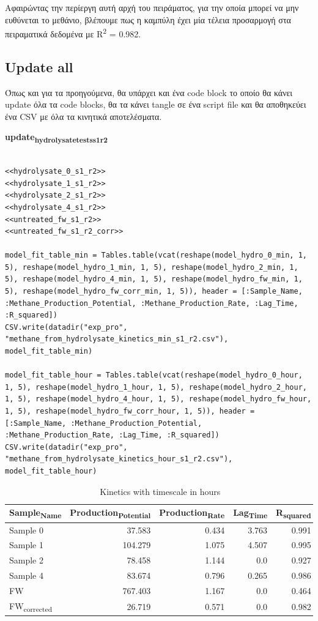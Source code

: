 \documentclass[11pt]{article}
\begin{document}
Αφαιρώντας την περίεργη αυτή αρχή του πειράματος, για την οποία μπορεί να μην ευθύνεται το μεθάνιο, βλέπουμε πως η καμπύλη έχει μία τέλεια προσαρμογή στα πειραματικά δεδομένα με R\textsuperscript{2} = 0.982.

\subsection{Update all}
\label{sec:orga64507c}
Όπως και για τα προηγούμενα, θα υπάρχει και ένα code block το οποίο θα κάνει update όλα τα code blocks, θα τα κάνει tangle σε ένα script file και θα αποθηκεύει ένα CSV με όλα τα κινητικά αποτελέσματα.

\textbf{update\textsubscript{hydrolysate}\textsubscript{tests}\textsubscript{s1}\textsubscript{r2}}
\begin{verbatim}

<<hydrolysate_0_s1_r2>>
<<hydrolysate_1_s1_r2>>
<<hydrolysate_2_s1_r2>>
<<hydrolysate_4_s1_r2>>
<<untreated_fw_s1_r2>>
<<untreated_fw_s1_r2_corr>>

model_fit_table_min = Tables.table(vcat(reshape(model_hydro_0_min, 1, 5), reshape(model_hydro_1_min, 1, 5), reshape(model_hydro_2_min, 1, 5), reshape(model_hydro_4_min, 1, 5), reshape(model_hydro_fw_min, 1, 5), reshape(model_hydro_fw_corr_min, 1, 5)), header = [:Sample_Name, :Methane_Production_Potential, :Methane_Production_Rate, :Lag_Time, :R_squared])
CSV.write(datadir("exp_pro", "methane_from_hydrolysate_kinetics_min_s1_r2.csv"), model_fit_table_min)

model_fit_table_hour = Tables.table(vcat(reshape(model_hydro_0_hour, 1, 5), reshape(model_hydro_1_hour, 1, 5), reshape(model_hydro_2_hour, 1, 5), reshape(model_hydro_4_hour, 1, 5), reshape(model_hydro_fw_hour, 1, 5), reshape(model_hydro_fw_corr_hour, 1, 5)), header = [:Sample_Name, :Methane_Production_Potential, :Methane_Production_Rate, :Lag_Time, :R_squared])
CSV.write(datadir("exp_pro", "methane_from_hydrolysate_kinetics_hour_s1_r2.csv"), model_fit_table_hour)
\end{verbatim}

\begin{table}[htbp]
\caption{Kinetics with timescale in hours}
\centering
\begin{tabular}{lrrrr}
Sample\textsubscript{Name} & Production\textsubscript{Potential} & Production\textsubscript{Rate} & Lag\textsubscript{Time} & R\textsubscript{squared}\\[0pt]
\hline
Sample 0 & 37.583 & 0.434 & 3.763 & 0.991\\[0pt]
Sample 1 & 104.279 & 1.075 & 4.507 & 0.995\\[0pt]
Sample 2 & 78.458 & 1.144 & 0.0 & 0.927\\[0pt]
Sample 4 & 83.674 & 0.796 & 0.265 & 0.986\\[0pt]
FW & 767.403 & 1.167 & 0.0 & 0.464\\[0pt]
FW\textsubscript{corrected} & 26.719 & 0.571 & 0.0 & 0.982\\[0pt]
\end{tabular}
\end{table}
\end{document}

